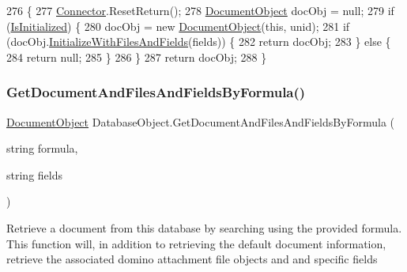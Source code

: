 \begin{DoxyCode}
276                                                                                    \{
277         \mbox{\hyperlink{class_connector}{Connector}}.ResetReturn();
278         \mbox{\hyperlink{class_document_object}{DocumentObject}} docObj = null;
279         \textcolor{keywordflow}{if} (\mbox{\hyperlink{class_database_object_a5fe036d32a30eb10d1b3f6a30263f740}{IsInitialized}}) \{
280             docObj = \textcolor{keyword}{new} \mbox{\hyperlink{class_document_object}{DocumentObject}}(\textcolor{keyword}{this}, unid);
281             \textcolor{keywordflow}{if} (docObj.\mbox{\hyperlink{class_document_object_a16350c0f471c95c82b418b7f1dc53694}{InitializeWithFilesAndFields}}(fields)) \{
282                 \textcolor{keywordflow}{return} docObj;
283             \} \textcolor{keywordflow}{else} \{
284                 \textcolor{keywordflow}{return} null;
285             \}
286         \}
287         \textcolor{keywordflow}{return} docObj;
288     \}
\end{DoxyCode}
\mbox{\label{class_database_object_ac158fa645a9ab75299dd3249576e3893}} 
\subsubsection{\texorpdfstring{Get\+Document\+And\+Files\+And\+Fields\+By\+Formula()}{GetDocumentAndFilesAndFieldsByFormula()}\hspace{0.1cm}{\footnotesize\ttfamily [1/2]}}
{\footnotesize\ttfamily \mbox{\hyperlink{class_document_object}{Document\+Object}} Database\+Object.\+Get\+Document\+And\+Files\+And\+Fields\+By\+Formula (\begin{DoxyParamCaption}\item[{string}]{formula,  }\item[{string}]{fields }\end{DoxyParamCaption})}



Retrieve a document from this database by searching using the provided formula. This function will, in addition to retrieving the default document information, retrieve the associated domino attachment file objects and and specific fields 

